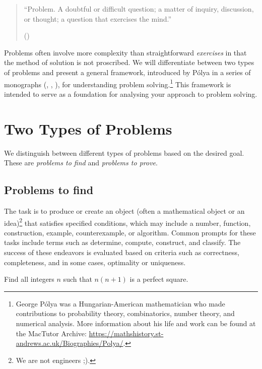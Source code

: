 \documentclass[
  a4paper,
  DIV=11,
  numbers=noendperiod,
  oneside]{scrreprt}
\begin{document}
\begin{quote}
``Problem. A doubtful or difficult question; a matter of inquiry,
discussion, or thought; a question that exercises the mind.''

()
\end{quote}

Problems often involve more complexity than straightforward
\emph{exercises} in that the method of solution is not proscribed. We
will differentiate between two types of problems and present a general
framework, introduced by Pólya in a series of monographs
(,
, ),
for understanding problem solving.\footnote{George Pólya was a
  Hungarian-American mathematician who made contributions to probability
  theory, combinatorics, number theory, and numerical analysis. More
  information about his life and work can be found at the MacTutor
  Archive:
  \url{https://mathshistory.st-andrews.ac.uk/Biographies/Polya/}.} This
framework is intended to serve as a foundation for analysing your
approach to problem solving.

\section{Two Types of Problems}\label{two-types-of-problems}

We distinguish between different types of problems based on the desired
goal. These are \emph{problems to find} and \emph{problems to prove}.

\subsection{Problems to find}\label{problems-to-find}

The task is to produce or create an object (often a mathematical object
or an idea)\footnote{We are not engineers ;).} that satisfies specified
conditions, which may include a number, function, construction, example,
counterexample, or algorithm. Common prompts for these tasks include
terms such as determine, compute, construct, and classify. The success
of these endeavors is evaluated based on criteria such as correctness,
completeness, and in some cases, optimality or uniqueness.

\begin{tcolorbox}[enhanced jigsaw, colframe=quarto-callout-note-color-frame, title=\textcolor{quarto-callout-note-color}{\faInfo}\hspace{0.5em}{Example of a problem to find}, breakable, opacityback=0, titlerule=0mm, colbacktitle=quarto-callout-note-color!10!white, toptitle=1mm, colback=white, coltitle=black, toprule=.15mm, bottomtitle=1mm, left=2mm, arc=.35mm, rightrule=.15mm, bottomrule=.15mm, opacitybacktitle=0.6, leftrule=.75mm]

Find all integers \(n\) such that \(n(n+1)\) is a perfect square.

\end{tcolorbox}
\end{document}
